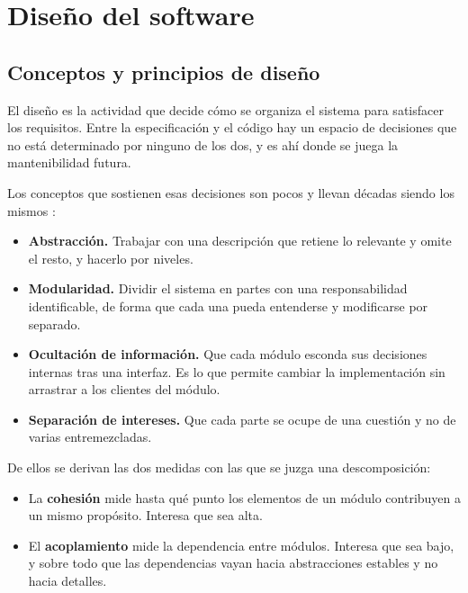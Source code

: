 \chapter{Diseño del software}

\section{Conceptos y principios de diseño}

El diseño es la actividad que decide cómo se organiza el sistema para satisfacer
los requisitos. Entre la especificación y el código hay un espacio de decisiones
que no está determinado por ninguno de los dos, y es ahí donde se juega la
mantenibilidad futura.

Los conceptos que sostienen esas decisiones son pocos y llevan décadas siendo los
mismos \cite{pressman2021}:

\begin{itemize}
    \item \textbf{Abstracción.} Trabajar con una descripción que retiene lo
          relevante y omite el resto, y hacerlo por niveles.
    \item \textbf{Modularidad.} Dividir el sistema en partes con una
          responsabilidad identificable, de forma que cada una pueda entenderse y
          modificarse por separado.
    \item \textbf{Ocultación de información.} Que cada módulo esconda sus
          decisiones internas tras una interfaz. Es lo que permite cambiar la
          implementación sin arrastrar a los clientes del módulo.
    \item \textbf{Separación de intereses.} Que cada parte se ocupe de una
          cuestión y no de varias entremezcladas.
\end{itemize}

De ellos se derivan las dos medidas con las que se juzga una descomposición:

\begin{itemize}
    \item La \textbf{cohesión} mide hasta qué punto los elementos de un módulo
          contribuyen a un mismo propósito. Interesa que sea alta.
    \item El \textbf{acoplamiento} mide la dependencia entre módulos. Interesa que
          sea bajo, y sobre todo que las dependencias vayan hacia abstracciones
          estables y no hacia detalles.
\end{itemize}


